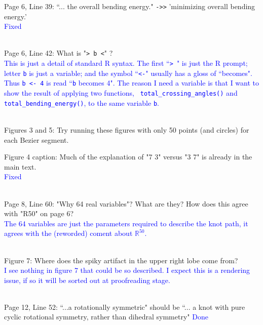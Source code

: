 \documentclass[12pt]{article}
\begin{document}
Page 6, Line 39: ``... the overall bending energy." {\tt ->>} 'minimizing
overall bending energy.'
\textcolor{blue}{\\Fixed\\ \\}

Page 6, Line 42: What is "{\tt > b <}" ?  \textcolor{blue}{\\ This is
  just a detail of standard R syntax.  The first ``{\tt > }" is just
  the R prompt; letter {\tt b} is just a variable; and the symbol
  ``{\tt <-}" usually has a gloss of ``becomes".  Thus {\tt b <- 4} is
  read ``{\tt b} becomes 4". The reason I need a variable is that I
  want to show the result of applying two functions, {\tt
    total\_crossing\_angles()} and {\tt total\_bending\_energy()}, to
  the same variable {\tt b}.\\ \\}


Figures 3 and 5: Try running these figures with only 50 points (and
circles) for each Bezier segment.

Figure 4 caption: Much of the explanation of "7 3" versus "3 7" is
already in the main text.  \textcolor{blue}{\\Fixed\\ \\}


Page 8, Line 60: "Why 64 real variables"?  What are they?  How does
this agree with "R50" on page 6?\textcolor{blue}{\\ The 64 variables are just the parameters required to describe the knot path, it agrees with the (reworded) coment about $\mathbb{R}^{50}$.\\ \\}



Figure 7: Where does the spiky artifact in the upper right lobe come
from?  \textcolor{blue}{\\I see nothing in figure 7 that could be so
  described.  I expect this is a rendering issue, if so it will be
  sorted out at proofreading stage.\\ \\}


Page 12, Line 52: ``...a rotationally symmetric" should be ``... a knot with
pure cyclic rotational symmetry, rather than dihedral symmetry"
  \textcolor{blue}{Done\\ \\}
\end{document}
